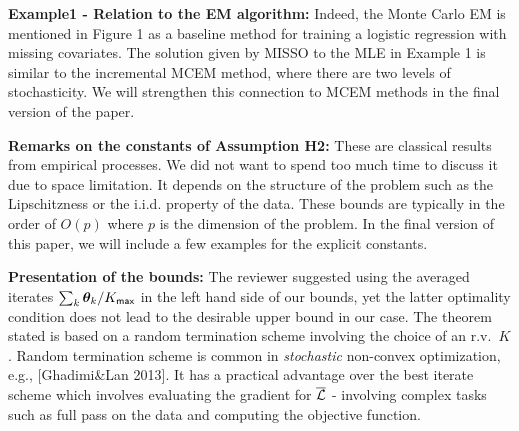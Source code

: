 \documentclass{article}
\begin{document}
\textbf{Example1 - Relation to the EM algorithm:} Indeed, the Monte Carlo EM is mentioned in Figure 1 as a baseline method for training a logistic regression with missing covariates. 
The solution given by MISSO to the MLE in Example 1 is similar to the incremental MCEM method, where there are two levels of stochasticity. 
We will strengthen this connection to MCEM methods in the final version of the paper. 

\textbf{Remarks on the constants of Assumption H2:} 
These are classical results from empirical processes. 
We did not want to spend too much time to discuss it due to space limitation. 
It depends on the structure of the problem such as the Lipschitzness or the i.i.d. property of the data.
These bounds are typically in the order of $O(p)$ where $p$ is the dimension of the problem.
In the final version of this paper, we will include a few examples for the explicit constants. 

\textbf{Presentation of the bounds:} 
The reviewer suggested using the averaged iterates $\sum_k \bm{\theta}_k / K_{\sf max}$ in the left hand side of our bounds, yet the latter optimality condition does not lead to the desirable upper bound in our case. 
The theorem stated is based on a random termination scheme involving the choice of an r.v.~$K$.
Random termination scheme is common in \emph{stochastic} non-convex optimization, e.g., [Ghadimi\&Lan 2013]. It has a practical advantage over the best iterate scheme which involves evaluating the gradient for $\overline{\cal L}$ - involving complex tasks such as full pass on the data and computing the objective function.
\end{document}
